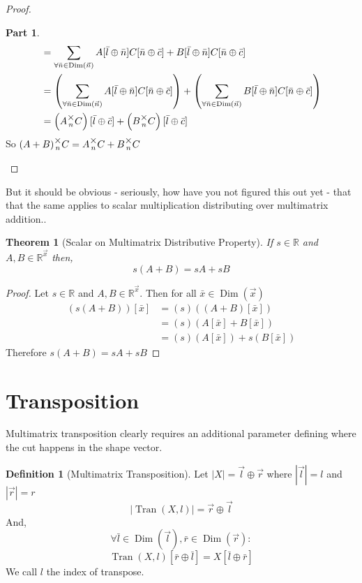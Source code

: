 \documentclass[12pt]{book}
\theoremstyle{plain}
\newtheorem{theorem}{Theorem}[chapter]
\theoremstyle{definition}
\newtheorem{definition}{Definition}[chapter]
\theoremstyle{ppart}
\newtheorem{ppart}{Part}
\theoremstyle{case}
\theoremstyle{solution}
\DeclareMathOperator{\Dim}{Dim}
\DeclareMathOperator{\Tran}{Tran}
\newcommand{\mmult}[1]{\text{\raisebox{1ex}{$\underset{#1}{\times}$}}}
\newcommand{\shape}[1]{\left|#1\right|}
\begin{document}
\begin{landscape}
\begin{proof}
\begin{ppart}
\begin{align*}
 &= \sum_{\forall \bar{n} \in \Dim(\vec{n})}
    A[\bar{l} \oplus \bar{n}]C[\bar{n} \oplus \bar{c}]
    +B[\bar{l} \oplus \bar{n}]C[\bar{n} \oplus \bar{c}] \\
 &= \left(\sum_{\forall \bar{n} \in \Dim(\vec{n})}
    A[\bar{l} \oplus \bar{n}]C[\bar{n} \oplus \bar{c}]\right)
    +
    \left(\sum_{\forall \bar{n} \in \Dim(\vec{n})}
    B[\bar{l} \oplus \bar{n}]C[\bar{n} \oplus \bar{c}]\right) \\
 &= \left(A \mmult{n} C\right)[\bar{l} \oplus \bar{c}]
    +\left(B \mmult{n} C\right)[\bar{l} \oplus \bar{c}]
\end{align*}
So $(A+B) \mmult{n} C = A \mmult{n} C + B \mmult{n} C$ 
\end{ppart}
\end{proof}
\end{landscape}

But it should be obvious - seriously, how have you not figured this out yet -
that that the same applies to scalar  multiplication distributing over multimatrix
addition..
\begin{theorem}[Scalar on Multimatrix Distributive Property]
If $s \in \mathbb{R}$ and $A, B \in \mathbb{R}^{\vec{x}}$ then,
\[ s(A + B) = sA + sB \]
\end{theorem}
\begin{proof}
Let $s \in \mathbb{R}$ and $A, B \in \mathbb{R}^{\vec{x}}$.
Then for all $\bar{x} \in \Dim(\vec{x})$
\begin{align*}
(s(A+B))[\bar{x}]
&= (s)((A+B)[\bar{x}]) \\
&= (s)(A[\bar{x}] + B[\bar{x}]) \\
&= (s)(A[\bar{x}]) + s(B[\bar{x}])
\end{align*}
Therefore $s(A+B) = sA + sB$
\end{proof}

\section{Transposition}

Multimatrix transposition clearly requires an additional parameter defining where
the cut happens in the shape vector.

\begin{definition}[Multimatrix Transposition]
\label{tran_def}
Let $\shape{X} = \vec{l} \oplus \vec{r}$ where $\shape{\vec{l}} = l$ and $\shape{\vec{r}} = r$
\[ \shape{\Tran(X, l)} = \vec{r} \oplus \vec{l} \]
And,
\[ \forall \bar{l} \in \Dim(\vec{l}), \bar{r} \in \Dim(\vec{r}) : \]
\[ \Tran(X, l)[\bar{r} \oplus \bar{l}] = X[\bar{l} \oplus \bar{r}] \]
We call $l$ the index of transpose.
\end{definition}
\end{document}
